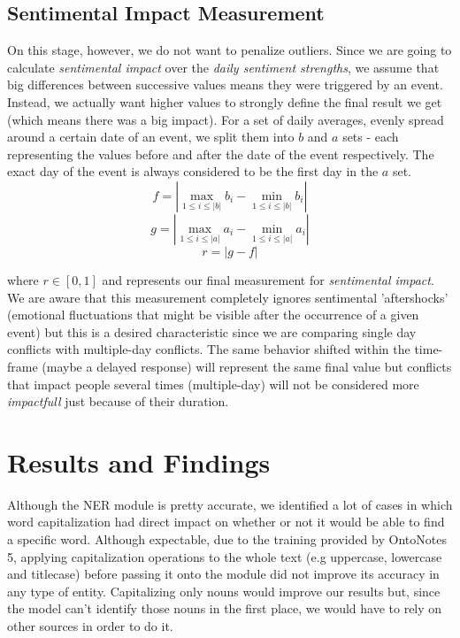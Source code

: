 \documentclass[11pt]{article}
\begin{document}
	\subsection{Sentimental Impact Measurement}
	\label{sub:sentimental_impact_measurement}
	On this stage, however, we do not want to penalize outliers. Since we are going to calculate \textit{sentimental impact} over the \textit{daily sentiment strengths}, we assume that big differences between successive values means they were triggered by an event. Instead, we actually want higher values to strongly define the final result we get (which means there was a big impact). 
	For a set of daily averages, evenly spread around a certain date of an event, we split them into $b$ and $a$ sets - each representing the values before and after the date of the event respectively. The exact day of the event is always considered to be the first day in the $a$ set.
	\begin{equation}
	f = |\max_{1 \leq i \leq |b|} b_{i} - \min_{1 \leq i \leq |b|} b_{i}|
	\end{equation}
	\begin{equation}
	g = |\max_{1 \leq i \leq |a|} a_{i} - \min_{1 \leq i \leq |a|} a_{i}|
	\end{equation}
	\begin{equation}
	r = |g - f|
	\end{equation}
	
	where $r \in [0, 1]$ and represents our final measurement for \textit{sentimental impact}. We are aware that this measurement completely ignores sentimental 'aftershocks' (emotional fluctuations that might be visible after the occurrence of a given event) but this is a desired characteristic since we are comparing single day conflicts with multiple-day conflicts. The same behavior shifted within the time-frame (maybe a delayed response) will represent the same final value but conflicts that impact people several times (multiple-day) will not be considered more \textit{impactfull} just because of their duration.
	
	\section{Results and Findings}
	Although the NER module is pretty accurate, we identified a lot of cases in which word capitalization had direct impact on whether or not it would be able to find a specific word. Although expectable, due to the training provided by OntoNotes 5, applying capitalization operations to the whole text (e.g uppercase, lowercase and titlecase) before passing it onto the module did not improve its accuracy in any type of entity. Capitalizing only nouns would improve our results but, since the model can't identify those nouns in the first place, we would have to rely on other sources in order to do it.
	
\end{document}
